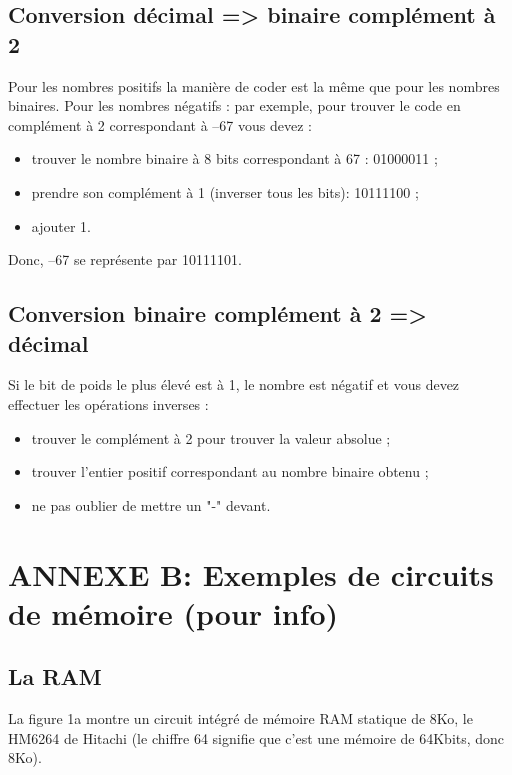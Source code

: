 \subsection*{Conversion décimal => binaire complément à 2}
Pour les nombres positifs la manière de coder est la même que pour les nombres binaires.
Pour les nombres négatifs : par exemple, pour trouver le code en complément à 2 correspondant à –67 vous devez :\\
\begin{itemize}
\item trouver le nombre binaire à 8 bits correspondant à 67 : 01000011 ;
\item prendre son complément à 1 (inverser tous les bits): 10111100 ;
\item ajouter 1.
\end{itemize}
Donc, –67 se représente par 10111101.

\subsection*{Conversion binaire complément à 2 => décimal}
Si le bit de poids le plus élevé est à 1, le nombre est négatif et vous devez effectuer les opérations inverses :
\begin{itemize}
\item trouver le complément à 2 pour trouver la valeur absolue ;
\item trouver l’entier positif correspondant au nombre binaire obtenu ;
\item ne pas oublier de mettre un "-" devant.
\end{itemize}



\section*{ANNEXE B: Exemples de circuits de mémoire (pour info)}
\vspace{-0.1cm}
\label{ANNEXE B}

\subsection*{La RAM}
La figure 1a montre un circuit intégré de mémoire RAM statique de 8Ko, le HM6264 de Hitachi (le chiffre 64 signifie que c’est une mémoire de 64Kbits, donc 8Ko).\\

